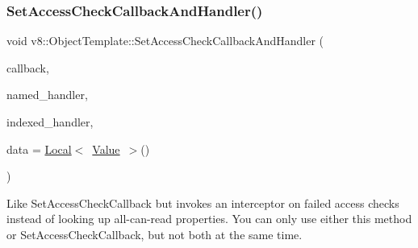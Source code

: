 \subsubsection{\texorpdfstring{Set\+Access\+Check\+Callback\+And\+Handler()}{SetAccessCheckCallbackAndHandler()}}
{\footnotesize\ttfamily void v8\+::\+Object\+Template\+::\+Set\+Access\+Check\+Callback\+And\+Handler (\begin{DoxyParamCaption}\item[{\mbox{\hyperlink{namespacev8_a1024fb358d107c1494163217830688e6}{Access\+Check\+Callback}}}]{callback,  }\item[{const \mbox{\hyperlink{structv8_1_1NamedPropertyHandlerConfiguration}{Named\+Property\+Handler\+Configuration}} \&}]{named\+\_\+handler,  }\item[{const \mbox{\hyperlink{structv8_1_1IndexedPropertyHandlerConfiguration}{Indexed\+Property\+Handler\+Configuration}} \&}]{indexed\+\_\+handler,  }\item[{\mbox{\hyperlink{classv8_1_1Local}{Local}}$<$ \mbox{\hyperlink{classv8_1_1Value}{Value}} $>$}]{data = {\ttfamily \mbox{\hyperlink{classv8_1_1Local}{Local}}$<$~\mbox{\hyperlink{classv8_1_1Value}{Value}}~$>$()} }\end{DoxyParamCaption})}

Like Set\+Access\+Check\+Callback but invokes an interceptor on failed access checks instead of looking up all-\/can-\/read properties. You can only use either this method or Set\+Access\+Check\+Callback, but not both at the same time. \mbox{\label{classv8_1_1ObjectTemplate_a878a503e6bae8b401a0631febf05cf8c}} 
